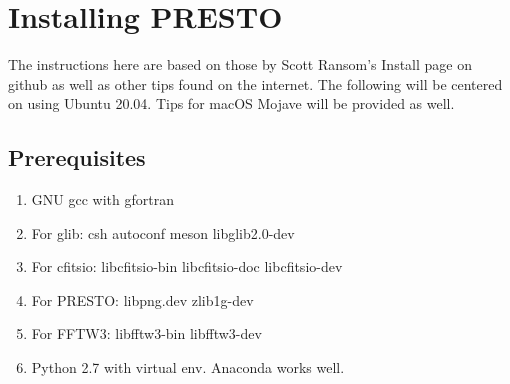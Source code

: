\documentclass{article}
\begin{document}
\section{Installing PRESTO}
The instructions here are based on those by Scott Ransom's Install page on github as well as other tips found on the internet. The following will be centered on using Ubuntu 20.04. Tips for macOS Mojave will be provided as well. 
\subsection{Prerequisites}
\begin{enumerate}
   	\item GNU gcc with gfortran
    \item For glib: csh autoconf meson libglib2.0-dev
    \item For cfitsio: libcfitsio-bin libcfitsio-doc libcfitsio-dev
    \item For PRESTO: libpng.dev zlib1g-dev
    \item For FFTW3: libfftw3-bin libfftw3-dev
    \item Python 2.7 with virtual env. Anaconda works well. 
\end{enumerate}
   
\end{document}
